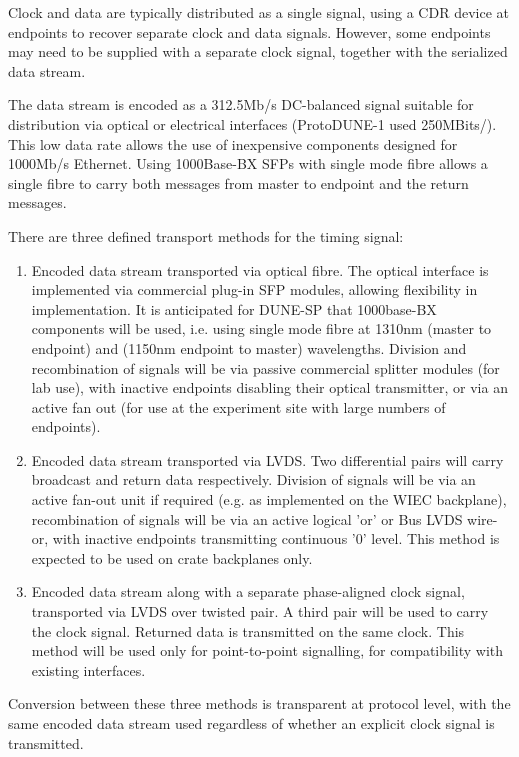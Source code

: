\documentclass[a4paper,11pt]{article}
\begin{document}
Clock and data are typically distributed as a single signal, using a CDR device at endpoints to recover separate clock and data signals. However, some endpoints may need to be supplied with a separate clock signal, together with the serialized data stream. 

The data stream is encoded as a 312.5Mb/s DC-balanced signal suitable for distribution via optical or electrical interfaces (ProtoDUNE-1 used 250MBits/). This low data rate allows the use of inexpensive components designed for 1000Mb/s Ethernet. Using 1000Base-BX SFPs with single mode fibre allows a single fibre to carry both messages from master to endpoint and the return messages.

There are three defined transport methods for the timing signal:

\begin{enumerate}
	\item Encoded data stream transported via optical fibre. The optical interface is implemented via commercial plug-in SFP modules, allowing flexibility in implementation. It is anticipated for DUNE-SP that 1000base-BX components will be used, i.e. using single mode fibre at 1310nm (master to endpoint) and (1150nm endpoint to master) wavelengths. Division and recombination of signals will be via passive commercial splitter modules (for lab use), with inactive endpoints disabling their optical transmitter, or via an active fan out (for use at the experiment site with large numbers of endpoints).
	\item Encoded data stream transported via LVDS. Two differential pairs will carry broadcast and return data respectively. Division of signals will be via an active fan-out unit if required (e.g. as implemented on the WIEC backplane), recombination of signals will be via an active logical 'or' or Bus LVDS wire-or, with inactive endpoints transmitting continuous '0' level. This method is expected to be used on crate backplanes only.
	\item Encoded data stream along with a separate phase-aligned clock signal, transported via LVDS over twisted pair. A third pair will be used to carry the clock signal. Returned data is transmitted on the same clock. This method will be used only for point-to-point signalling, for compatibility with existing interfaces.
\end{enumerate}

Conversion between these three methods is transparent at protocol level, with the same encoded data stream used regardless of whether an explicit clock signal is transmitted.
\end{document}
